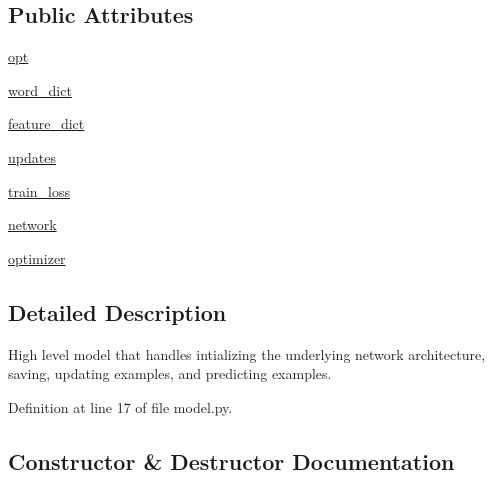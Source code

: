 \subsection*{Public Attributes}
\begin{DoxyCompactItemize}
\item 
\hyperlink{classparlai_1_1agents_1_1drqa_1_1model_1_1DocReaderModel_ae6b1a15378e076ef66f15bf4183f8d69}{opt}
\item 
\hyperlink{classparlai_1_1agents_1_1drqa_1_1model_1_1DocReaderModel_a2c53c78892ade8ebd82cb581608d58dd}{word\+\_\+dict}
\item 
\hyperlink{classparlai_1_1agents_1_1drqa_1_1model_1_1DocReaderModel_a89edfda425c66170c166156d5f3e8a18}{feature\+\_\+dict}
\item 
\hyperlink{classparlai_1_1agents_1_1drqa_1_1model_1_1DocReaderModel_aa614f2c9cef3332b2af7a48552820f17}{updates}
\item 
\hyperlink{classparlai_1_1agents_1_1drqa_1_1model_1_1DocReaderModel_aaea517209501c80d5d8b86fa666c8dc6}{train\+\_\+loss}
\item 
\hyperlink{classparlai_1_1agents_1_1drqa_1_1model_1_1DocReaderModel_a2c06172550232ff17fa3b6538c1b3d55}{network}
\item 
\hyperlink{classparlai_1_1agents_1_1drqa_1_1model_1_1DocReaderModel_a97fe699cd31edef437716191498eedd9}{optimizer}
\end{DoxyCompactItemize}


\subsection{Detailed Description}
\begin{DoxyVerb}High level model that handles intializing the underlying network architecture,
saving, updating examples, and predicting examples.
\end{DoxyVerb}
 

Definition at line 17 of file model.\+py.



\subsection{Constructor \& Destructor Documentation}
\mbox{\label{classparlai_1_1agents_1_1drqa_1_1model_1_1DocReaderModel_ab669b8ef6f50f9c6d81f3544c42727e9}} 
